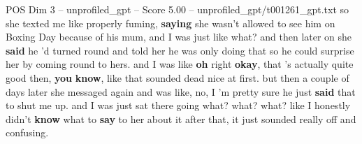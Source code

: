 \begin{textsample}{POS Dim 3 – unprofiled\_gpt – Score 5.00 – unprofiled\_gpt/t001261\_gpt.txt}  \label{ex:f3_pos_039}
so she texted me like properly fuming, \textbf{saying} she wasn't allowed to see him on Boxing Day because of his mum, and I was just like what? and then later on she \textbf{said} he ’d turned round and told her he was only doing that so he could surprise her by coming round to hers. and I was like \textbf{oh} right \textbf{okay}, that ’s actually quite good then, \textbf{you} \textbf{know}, like that sounded dead nice at first. but then a couple of days later she messaged again and was like, no, I ’m pretty sure he just \textbf{said} that to shut me up. and I was just sat there going what? what? what? like I honestly didn't \textbf{know} what to \textbf{say} to her about it after that, it just sounded really off and confusing.

\end{textsample}
